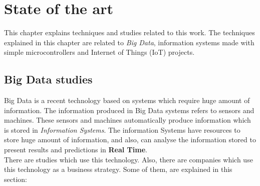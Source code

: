 
\chapter{State of the art}
\newpage

This chapter explains techniques and studies related to this work. The techniques explained in this chapter are related to \textit{Big Data}, information systems made with simple microcontrollers and Internet of Things (IoT) projects.\\

\section{Big Data studies}

Big Data is a recent technology based on systems which require huge amount of information. The information produced in Big Data systems refers to sensors and machines. These sensors and machines automatically produce information which is stored in \textit{Information Systems}. The information Systems have resources to store huge amount of information, and also, can analyse the information stored to present results and predictions in \textbf{Real Time}.\\

There are studies which use this technology. Also, there are companies which use this technology as a business strategy. Some of them, are explained in this section:

